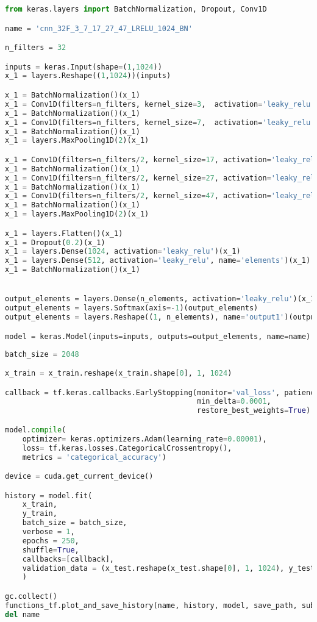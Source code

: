 \begin{lstlisting}[language=Python]
from keras.layers import BatchNormalization, Dropout, Conv1D

name = 'cnn_32F_3_7_17_27_47_LRELU_1024_BN'

n_filters = 32

inputs = keras.Input(shape=(1,1024))
x_1 = layers.Reshape((1,1024))(inputs)

x_1 = BatchNormalization()(x_1)
x_1 = Conv1D(filters=n_filters, kernel_size=3,  activation='leaky_relu', data_format='channels_first')(x_1)
x_1 = BatchNormalization()(x_1)
x_1 = Conv1D(filters=n_filters, kernel_size=7,  activation='leaky_relu', data_format='channels_first')(x_1)
x_1 = BatchNormalization()(x_1)
x_1 = layers.MaxPooling1D(2)(x_1)

x_1 = Conv1D(filters=n_filters/2, kernel_size=17, activation='leaky_relu', data_format='channels_first')(x_1)
x_1 = BatchNormalization()(x_1)
x_1 = Conv1D(filters=n_filters/2, kernel_size=27, activation='leaky_relu', data_format='channels_first')(x_1)
x_1 = BatchNormalization()(x_1)
x_1 = Conv1D(filters=n_filters/2, kernel_size=47, activation='leaky_relu', data_format='channels_first')(x_1)
x_1 = BatchNormalization()(x_1)
x_1 = layers.MaxPooling1D(2)(x_1)

x_1 = layers.Flatten()(x_1)
x_1 = Dropout(0.2)(x_1)
x_1 = layers.Dense(1024, activation='leaky_relu')(x_1)
x_1 = layers.Dense(512, activation='leaky_relu', name='elements')(x_1)
x_1 = BatchNormalization()(x_1)


output_elements = layers.Dense(n_elements, activation='leaky_relu')(x_1)
output_elements = layers.Softmax(axis=-1)(output_elements)
output_elements = layers.Reshape((1, n_elements), name='output1')(output_elements)

model = keras.Model(inputs=inputs, outputs=output_elements, name=name)
\end{lstlisting}

\begin{lstlisting}[language=Python]
batch_size = 2048

x_train = x_train.reshape(x_train.shape[0], 1, 1024)

callback = tf.keras.callbacks.EarlyStopping(monitor='val_loss', patience=10,
                                            min_delta=0.0001,
                                            restore_best_weights=True)

model.compile(
    optimizer= keras.optimizers.Adam(learning_rate=0.00001),
    loss= tf.keras.losses.CategoricalCrossentropy(),
    metrics = 'categorical_accuracy')

device = cuda.get_current_device()

history = model.fit(
    x_train,
    y_train,
    batch_size = batch_size,
    verbose = 1,
    epochs = 250,
    shuffle=True,
    callbacks=[callback],
    validation_data = (x_test.reshape(x_test.shape[0], 1, 1024), y_test)
    )

gc.collect()
functions_tf.plot_and_save_history(name, history, model, save_path, subfolder='CNN')
del name
\end{lstlisting}

